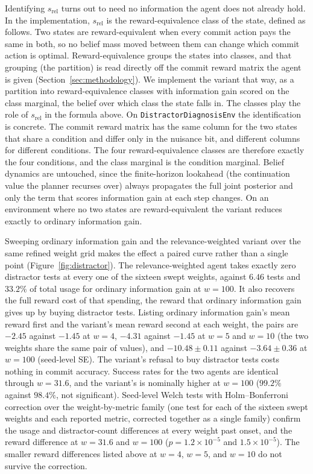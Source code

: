 Identifying $s_{\mathrm{rel}}$ turns out to need no information the agent does not already hold. In the implementation, $s_{\mathrm{rel}}$ is the reward-equivalence class of the state, defined as follows. Two states are reward-equivalent when every commit action pays the same in both, so no belief mass moved between them can change which commit action is optimal. Reward-equivalence groups the states into classes, and that grouping (the partition) is read directly off the commit reward matrix the agent is given (Section~\ref{sec:methodology}). We implement the variant that way, as a partition into reward-equivalence classes with information gain scored on the class marginal, the belief over which class the state falls in. The classes play the role of $s_{\mathrm{rel}}$ in the formula above. On \texttt{DistractorDiagnosisEnv} the identification is concrete. The commit reward matrix has the same column for the two states that share a condition and differ only in the nuisance bit, and different columns for different conditions. The four reward-equivalence classes are therefore exactly the four conditions, and the class marginal is the condition marginal. Belief dynamics are untouched, since the finite-horizon lookahead (the continuation value the planner recurses over) always propagates the full joint posterior and only the term that scores information gain at each step changes. On an environment where no two states are reward-equivalent the variant reduces exactly to ordinary information gain.

Sweeping ordinary information gain and the relevance-weighted variant over the same refined weight grid makes the effect a paired curve rather than a single point (Figure~\ref{fig:distractor}). The relevance-weighted agent takes exactly zero distractor tests at every one of the sixteen swept weights, against $6.46$ tests and $33.2\%$ of total usage for ordinary information gain at $w{=}100$. It also recovers the full reward cost of that spending, the reward that ordinary information gain gives up by buying distractor tests. Listing ordinary information gain's mean reward first and the variant's mean reward second at each weight, the pairs are $-2.45$ against $-1.45$ at $w{=}4$, $-4.31$ against $-1.45$ at $w{=}5$ and $w{=}10$ (the two weights share the same pair of values), and $-10.48 \pm 0.11$ against $-3.64 \pm 0.36$ at $w{=}100$ (seed-level SE). The variant's refusal to buy distractor tests costs nothing in commit accuracy. Success rates for the two agents are identical through $w{=}31.6$, and the variant's is nominally higher at $w{=}100$ ($99.2\%$ against $98.4\%$, not significant). Seed-level Welch tests with Holm--Bonferroni correction over the weight-by-metric family (one test for each of the sixteen swept weights and each reported metric, corrected together as a single family) confirm the usage and distractor-count differences at every weight past onset, and the reward difference at $w{=}31.6$ and $w{=}100$ ($p{=}1.2{\times}10^{-5}$ and $1.5{\times}10^{-5}$). The smaller reward differences listed above at $w{=}4$, $w{=}5$, and $w{=}10$ do not survive the correction.

